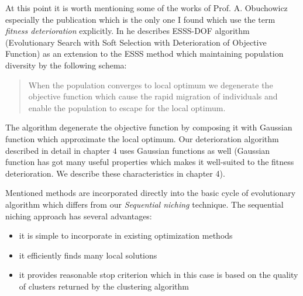 At this point it is worth mentioning some of the works of Prof. A. Obuchowicz 
especially the publication \cite{esss} which is the only one I found which 
use the term \textit{fitness deterioration} explicitly.
In \cite{esss} he describes ESSS-DOF algorithm (Evolutionary Search with Soft
Selection with Deterioration of Objective Function) as an extension to the ESSS
method which maintaining population diversity by the following schema:
\begin{quotation}
When the population converges to local optimum we degenerate the objective 
function which cause the rapid migration of individuals and enable the 
population to escape for the local optimum.
\end{quotation}

The algorithm degenerate the objective function by composing it with Gaussian
function which approximate the local optimum. Our deterioration algorithm
described in detail in chapter 4 uses Gaussian functions as well
(Gaussian function has got many useful properties which makes it well-suited
to the fitness deterioration. We describe these characteristics in chapter 4).

Mentioned methods are incorporated directly into the basic cycle of evolutionary
algorithm which differs from our \textit{Sequential niching} technique. 
The sequential niching approach has several advantages:

\begin{itemize}
  \item it is simple to incorporate in existing optimization methods
  \item it efficiently finds many local solutions
  \item it provides reasonable stop criterion which in this case is based on the
  quality of clusters returned by the clustering algorithm
\end{itemize}


